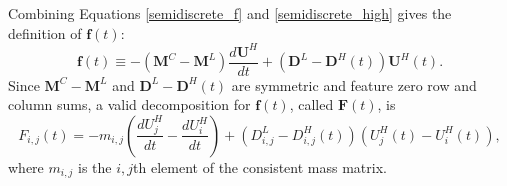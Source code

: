 Combining Equations \eqref{semidiscrete_f} and \eqref{semidiscrete_high}
gives the definition of $\mathbf{f}(t)$:
\begin{equation}\label{gtf}
   \mathbf{f}(t) \equiv -\left(\mathbf{M}^C-\mathbf{M}^L\right)
   \frac{d\mathbf{U}^H}{dt}
      +\left(\mathbf{D}^L-\mathbf{D}^H(t)\right)\mathbf{U}^H(t).
\end{equation}
Since $\mathbf{M}^C-\mathbf{M}^L$ and $\mathbf{D}^L-\mathbf{D}^H(t)$ are symmetric
and feature zero row and column sums, a valid decomposition for $\mathbf{f}(t)$,
called $\mathbf{F}(t)$, is
\begin{equation}
   F_{i,j}(t) = -m_{i,j}\left(\frac{dU_j^H}{dt} - \frac{dU_i^H}{dt}\right)
   + \left(D_{i,j}^L-D_{i,j}^H(t)\right)\left(U_j^H(t) - U_i^H(t)\right),
\end{equation}
where $m_{i,j}$ is the $i,j$th element of the consistent mass matrix.
